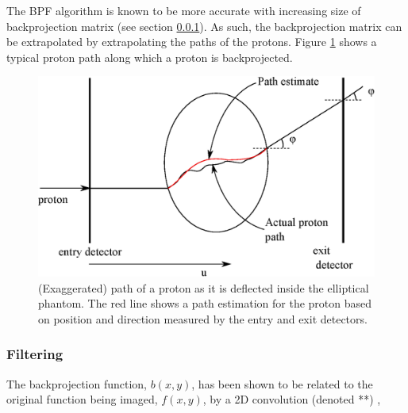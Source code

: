 \documentclass[11pt,a4paper]{article}
\begin{document}
The BPF algorithm is known to be more accurate with increasing size of backprojection matrix (see section \ref{sec:BPFfiltering}). As such, the backprojection matrix can be extrapolated by extrapolating the paths of the protons. Figure \ref{fig:backproject} shows a typical proton path along which a proton is backprojected.

\begin{figure}[!htb]
\centering
\includegraphics[scale=0.5]{img/backproject.eps}
\caption{(Exaggerated) path of a proton as it is deflected inside the elliptical phantom. The red line shows a path estimation for the proton based on position and direction measured by the entry and exit detectors.}
\label{fig:backproject}
\end{figure}


\subsubsection{Filtering}
\label{sec:BPFfiltering}
The backprojection function, $b(x,y)$, has been shown to be related to the original function being imaged, $f(x,y)$, by a 2D convolution (denoted **) \parencite{zeng1994backprojection},
\end{document}
